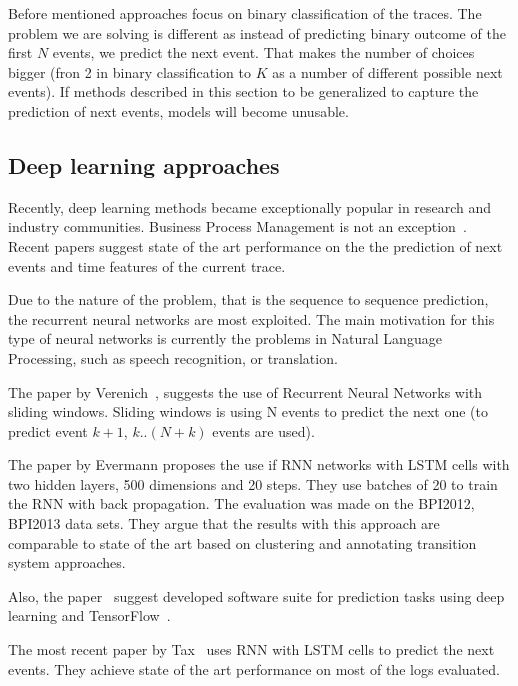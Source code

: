 Before mentioned approaches focus on binary classification of the traces. The problem we are solving is different as instead of predicting binary outcome of the first $N$ events, we predict the next event. That makes the number of choices bigger (fron 2 in binary classification to $K$ as a number of different possible next events). If methods described in this section to be generalized to capture the prediction of next events, models will become unusable.

\subsection{Deep learning approaches} \label{deeplearning-stateoftheart}

Recently, deep learning methods became exceptionally popular in research and industry communities. Business Process Management is not an exception~\cite{quteprints96732,niek96732,evermann}. Recent papers suggest state of the art performance on the the prediction of next events and time features of the current trace.

Due to the nature of the problem, that is the sequence to sequence prediction, the recurrent neural networks are most exploited. The main motivation for this type of neural networks is currently the problems in Natural Language Processing, such as speech recognition\cite{graves2013icassp}, or translation\cite{Sutskever2014SSL29690332969173}. 

The paper by Verenich~\cite{quteprints96732}, suggests the use of Recurrent Neural Networks with sliding windows. Sliding windows is using N events to predict the next one (to predict event $k+1$,  $k..(N+k)$ events are used). 

The paper by Evermann\cite{evermann} proposes the use if RNN networks with LSTM cells with two hidden layers, 500 dimensions and 20 steps. They use batches of 20 to train the RNN with back propagation. The evaluation was made on the BPI2012, BPI2013 data sets. They argue that the results with this approach are comparable to state of the art based on clustering and annotating transition system approaches.

Also, the paper~\cite{evermann2} suggest developed software suite for prediction tasks using deep learning and TensorFlow~\cite{tensorflow2015-whitepaper}.

The most recent paper by Tax~\cite{niek96732} uses RNN with LSTM cells to predict the next events. They achieve state of the art performance on most of the logs evaluated. 


